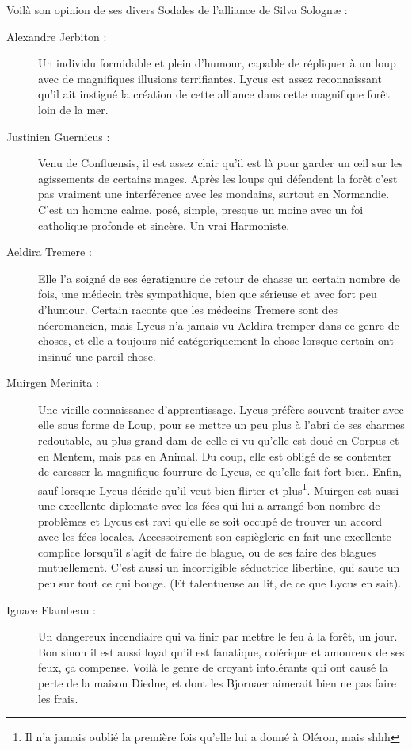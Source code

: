 Voilà son opinion de ses divers Sodales de l'alliance de Silva Solognæ :
\begin{description}
\item[Alexandre Jerbiton :] Un individu formidable et plein d'humour, capable de répliquer à un loup avec de magnifiques illusions terrifiantes. Lycus est assez reconnaissant qu'il ait instigué la création de cette alliance dans cette magnifique forêt loin de la mer.
\item[Justinien Guernicus :] Venu de Confluensis, il est assez clair qu'il est là pour garder un œil sur les agissements de certains mages. Après les loups qui défendent la forêt c'est pas vraiment une interférence avec les mondains, surtout en Normandie. C'est un homme calme, posé, simple, presque un moine avec un foi catholique profonde et sincère. Un vrai Harmoniste.
\item[Aeldira Tremere :] Elle l'a soigné de ses égratignure de retour de chasse un certain nombre de fois, une médecin très sympathique, bien que sérieuse et avec fort peu d'humour. Certain raconte que les médecins Tremere sont des nécromancien, mais Lycus n'a jamais vu Aeldira tremper dans ce genre de choses, et elle a toujours nié catégoriquement la chose lorsque certain ont insinué une pareil chose.
\item[Muirgen Merinita :] Une vieille connaissance d'apprentissage. Lycus préfère souvent traiter avec elle sous forme de Loup, pour se mettre un peu plus à l'abri de ses charmes redoutable, au plus grand dam de celle-ci vu qu'elle est doué en Corpus et en Mentem, mais pas en Animal. Du coup, elle est obligé de se contenter de caresser la magnifique fourrure de Lycus, ce qu'elle fait fort bien. Enfin, sauf lorsque Lycus décide qu'il veut bien flirter et plus\footnote{Il n'a jamais oublié la première fois qu'elle lui a donné à Oléron, mais shhh}.
Muirgen est aussi une excellente diplomate avec les fées qui lui a arrangé bon nombre de problèmes et Lycus est ravi qu'elle se soit occupé de trouver un accord avec les fées locales. Accessoirement son espièglerie en fait une excellente complice lorsqu'il s'agit de faire de blague, ou de ses faire des blagues mutuellement.
C'est aussi un incorrigible séductrice libertine, qui saute un peu sur tout ce qui bouge. (Et talentueuse au lit, de ce que Lycus en sait).
\item[Ignace Flambeau :] Un dangereux incendiaire qui va finir par mettre le feu à la forêt, un jour. Bon sinon il est aussi loyal qu'il est fanatique, colérique et amoureux de ses feux, ça compense. Voilà le genre de croyant intolérants qui ont causé la perte de la maison Diedne, et dont les Bjornaer aimerait bien ne pas faire les frais.

\end{description}
